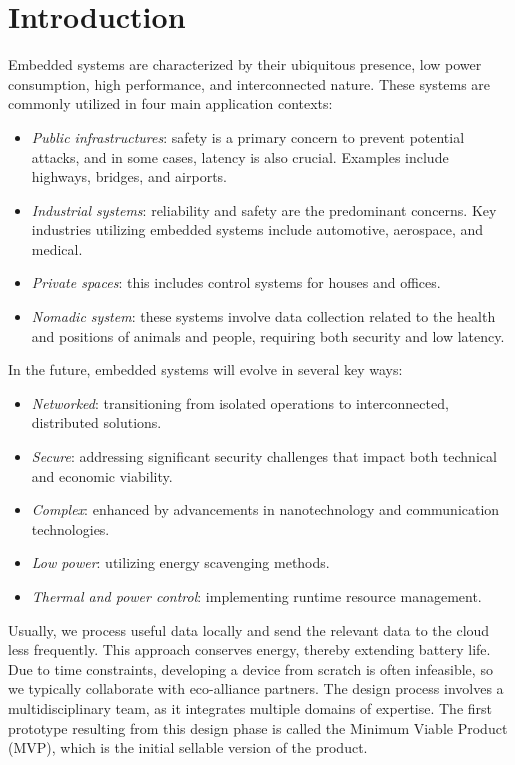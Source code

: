 \section{Introduction}

Embedded systems are characterized by their ubiquitous presence, low power consumption, high performance, and interconnected nature.
These systems are commonly utilized in four main application contexts:
\begin{itemize}
    \item \textit{Public infrastructures}: safety is a primary concern to prevent potential attacks, and in some cases, latency is also crucial. 
        Examples include highways, bridges, and airports.
    \item \textit{Industrial systems}: reliability and safety are the predominant concerns. 
        Key industries utilizing embedded systems include automotive, aerospace, and medical.
    \item \textit{Private spaces}: this includes control systems for houses and offices.
    \item \textit{Nomadic system}: these systems involve data collection related to the health and positions of animals and people, requiring both security and low latency.
\end{itemize}
In the future, embedded systems will evolve in several key ways:
\begin{itemize}
\item \textit{Networked}: transitioning from isolated operations to interconnected, distributed solutions.
\item \textit{Secure}: addressing significant security challenges that impact both technical and economic viability.
\item \textit{Complex}: enhanced by advancements in nanotechnology and communication technologies.
\item \textit{Low power}: utilizing energy scavenging methods.
\item \textit{Thermal and power control}: implementing runtime resource management.
\end{itemize}
Usually, we process useful data locally and send the relevant data to the cloud less frequently. 
This approach conserves energy, thereby extending battery life. 
Due to time constraints, developing a device from scratch is often infeasible, so we typically collaborate with eco-alliance partners. 
The design process involves a multidisciplinary team, as it integrates multiple domains of expertise. 
The first prototype resulting from this design phase is called the Minimum Viable Product (MVP), which is the initial sellable version of the product.





